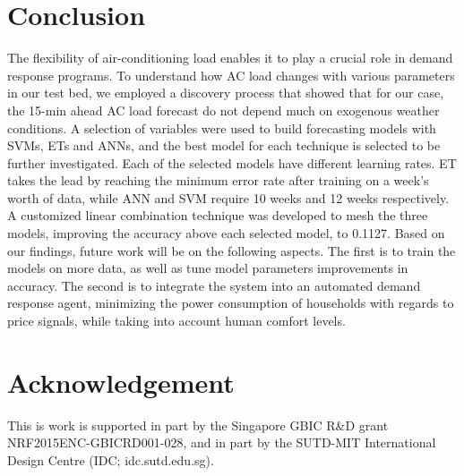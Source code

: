 \documentclass[conference]{IEEEtran}
\begin{document}
\section{Conclusion}\label{conc}
The flexibility of air-conditioning load enables it to play a crucial role in demand response programs. To understand how AC load changes with various parameters in our test bed, we employed a discovery process that showed that for our case, the 15-min ahead AC load forecast do not depend much on exogenous weather conditions. A selection of variables were used to build forecasting models with SVMs, ETs and ANNs, and the best model for each technique is selected to be further investigated. Each of the selected models have different learning rates. ET takes the lead by reaching the minimum error rate after training on a week's worth of data, while ANN and SVM require 10 weeks and 12 weeks respectively. A customized linear combination technique was developed to mesh the three models, improving the accuracy above each selected model, to 0.1127.  
Based on our findings, future work will be on the following aspects. The first is to train the models on more data, as well as tune model parameters improvements in accuracy. The second is to integrate the system into an automated demand response agent, minimizing the power consumption of households with regards to price signals, while taking into account human comfort levels.

\section*{Acknowledgement}
This is work is supported in part by the Singapore GBIC R\&D grant NRF2015ENC-GBICRD001-028, and in part by the SUTD-MIT International Design Centre (IDC; idc.sutd.edu.sg).


\small

 \footnotesize



\end{document}
